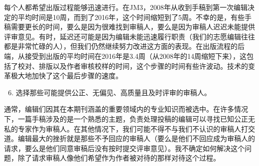每个人都希望出版过程能够迅速进行。在JM3，2008年从收到手稿到第一次编辑决定的平均时间是10周，而到了2016年，这个时间缩短到了5周。不幸的是，有些手稿需要更长的时间，要么是因为很难找到审稿人，要么是因为审稿人迟迟未能提供评审意见。有时，延迟还可能是因为编辑未能迅速履行职责（我们的志愿编辑往往都是非常忙碌的人），但我们仍然继续努力改进这方面的表现。在出版流程的后端，从接受到出版的平均时间在2016年是3.4周（从2008年的14周缩短下来），这包括了校对、排版以及作者审核校样的时间，这个步骤的时间有些许波动。技术的变革极大地加快了这个最后步骤的速度。

\begin{enumerate}
  \setcounter{enumi}{5}
\item 选择那些可能提供公正、无偏见、高质量且及时评审的审稿人。
\end{enumerate}

通常，编辑们因其在本期刊涵盖的重要领域内的专业知识而被选中。在许多情况下，一篇手稿涉及的是一个熟悉的主题，负责处理投稿的编辑可以寻找已知公正无私的专家作为审稿人。在其他情况下，我们可能不得不与我们不认识的审稿人打交道。编辑最大的挫折就是那些不予回应的审稿人（要么是他们不回应成为审稿人的请求，要么是他们同意审稿后没有按时提交评审意见）。我不确定如何解决这个问题，除了请求审稿人像他们希望作为作者被对待的那样对待这个过程。

